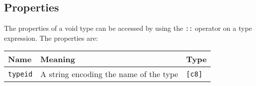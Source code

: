 \subsection{Properties}
\label{sec:orgffa98ee}

The properties of a void type can be accessed by using the \texttt{::} operator
on a type expression. The properties are:

\begin{center}
  \vspace{-5pt}
  \begin{adjustbox}{max width=\linewidth}
    \begin{tabular}{|l|ll|}
      \hline
      Name & Meaning & Type\\[0pt]
      \hline
      \hline
      \texttt{typeid} & A string encoding the name of the type & \texttt{[c8]}\\[0pt]
      \hline
    \end{tabular}
  \end{adjustbox}
\end{center}
